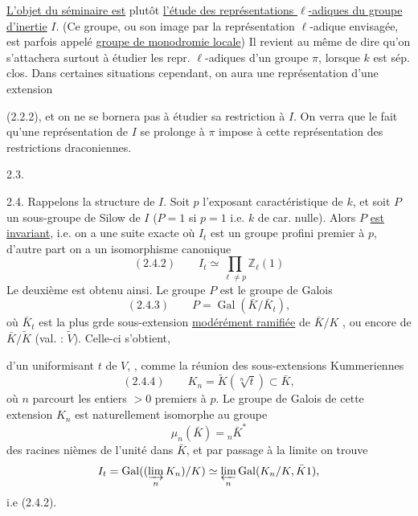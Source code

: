 \uline{L'objet du séminaire est} plutôt \uline{l'étude des représentations $\ell$-adiques du groupe d'inertie} $I$. (Ce groupe, ou son image par la représentation $\ell$-adique envisagée,  est parfois appelé \uline{groupe de monodromie locale}) Il revient au même de dire qu'on s'attachera surtout à étudier les repr. $\ell$-adiques d'un groupe $\pi$, lorsque $k$ est sép. clos. Dans certaines situations cependant, on aura une représentation d'une extension

(2.2.2), et on ne se bornera pas  à étudier sa restriction à $I$.  On verra que   le fait qu'une représentation de $I$ se prolonge à $\pi$ impose à cette représentation des restrictions draconiennes.

2.3.

2.4. Rappelons la structure de $I$. Soit $p$ l'exposant caractéristique de $k$,  et soit $P$  un  sous-groupe de Silow de $I$ ($P=1$ si $p=1$ i.e. $k$ de car. nulle). Alors $P$ \uline{est invariant}, i.e. on a une suite exacte
où $I_t$  est un groupe profini premier à $p$, d'autre part on a un isomorphisme canonique
\[
(2.4.2)\qquad I_t\simeq\prod_{\ell\ne p}\mathbb Z_\ell(1)
\]
Le deuxième est obtenu ainsi. Le groupe $P$ est le groupe de Galois 
\[
(2.4.3)\qquad P=\operatorname{Gal}(\bar K/\bar K_t),
\]
où $\bar K_t$ est la plus  grde sous-extension \uline{modérément ramifiée} de $\bar K/K$ , ou encore de $\bar K/\widetilde K$ (val. : $\widetilde V$). Celle-ci s'obtient, 

d'un uniformisant \deleted{$\unsure{\varpi}$} $t$ de $V$, , comme la réunion des sous-extensions  Kummeriennes
\[
(2.4.4)\qquad K_n=\widetilde K(\sqrt[n]{t})\subset\bar K,
\]
où $n$ parcourt les entiers $>0$ premiers à $p$.
Le groupe de Galois de cette extension $K_n$ est naturellement isomorphe au groupe
\[
\mu_n(\bar K)={}_n\bar K^*
\]
des racines nièmes de l'unité dans $\bar K$, et par passage à la limite on trouve
\[
 I_t=\operatorname{Gal}((\varinjlim_n K_n)/K)\simeq\varprojlim_n\operatorname{Gal}(K_n/K,{{\bar K}}{1}),
\]
i.e (2.4.2).

